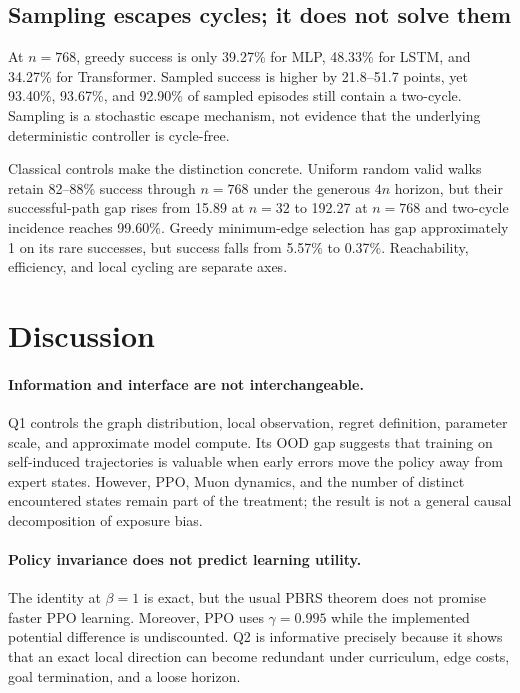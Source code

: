 \documentclass[10pt,twocolumn]{article}
\begin{document}
\subsection{Sampling escapes cycles; it does not solve them}

At $n=768$, greedy success is only 39.27\% for MLP, 48.33\% for LSTM, and
34.27\% for Transformer.  Sampled success is higher by 21.8--51.7 points, yet
93.40\%, 93.67\%, and 92.90\% of sampled episodes still contain a two-cycle.
Sampling is a stochastic escape mechanism, not evidence that the underlying
deterministic controller is cycle-free.

Classical controls make the distinction concrete.  Uniform random valid walks
retain 82--88\% success through $n=768$ under the generous $4n$ horizon, but
their successful-path gap rises from 15.89 at $n=32$ to 192.27 at $n=768$ and
two-cycle incidence reaches 99.60\%.  Greedy minimum-edge selection has gap
approximately 1 on its rare successes, but success falls from 5.57\% to
0.37\%.  Reachability, efficiency, and local cycling are separate axes.

\section{Discussion}
\label{sec:discussion}

\paragraph{Information and interface are not interchangeable.}
Q1 controls the graph distribution, local observation, regret definition,
parameter scale, and approximate model compute.  Its OOD gap suggests that
training on self-induced trajectories is valuable when early errors move the
policy away from expert states.  However, PPO, Muon dynamics, and the number of
distinct encountered states remain part of the treatment; the result is not a
general causal decomposition of exposure bias.

\paragraph{Policy invariance does not predict learning utility.}
The identity at $\beta=1$ is exact, but the usual PBRS theorem does not promise
faster PPO learning.  Moreover, PPO uses $\gamma=0.995$ while the implemented
potential difference is undiscounted.  Q2 is informative precisely because it
shows that an exact local direction can become redundant under curriculum,
edge costs, goal termination, and a loose horizon.
\end{document}
